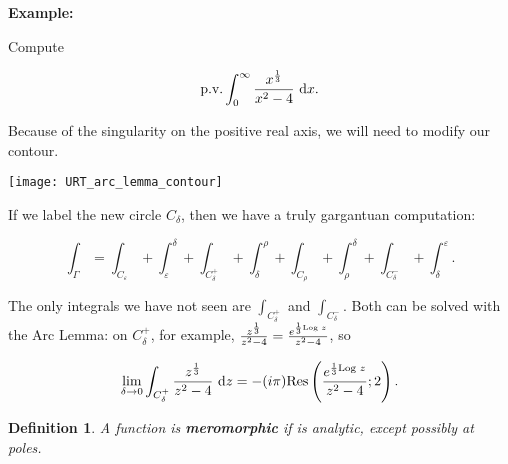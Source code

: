 \documentclass{article}
\theoremstyle{colontheorem}
\newtheorem{definition}[theorem]{Definition}
\newcommand{\Log}{\textnormal{Log }}
\newcommand{\Res}{\textnormal{Res}}
\newcommand{\pv}{\textnormal{p.v.}}
\newenvironment{Def}
{
	\begin{mdframed}[backgroundcolor=DefGreen!10]
	\begin{definition}
}
{
	\end{definition}
	\end{mdframed}
	
	\vspace{.15in}
}
\newenvironment{Example}
{
	\begin{mdframed}
	\textbf{Example:}%
}
{
	\end{mdframed}
	
	\vspace{.15in}
}
\begin{document}
\begin{Example}
	Compute
	
	$$
		\pv \int_0^\infty \frac{x^{\frac{1}{3}}}{x^2 - 4}\ \textnormal{d}x.
	$$
	
	Because of the singularity on the positive real axis, we will need to modify our contour.
	
	\begin{center}
		
		\texttt{[image: URT\_arc\_lemma\_contour]}
		
	\end{center}
	
	If we label the new circle $C_\delta$, then we have a truly gargantuan computation:
	
	$$
		\int_\Gamma = \int_{C_\varepsilon} + \int_\varepsilon^\delta + \int_{C_\delta^+} + \int_\delta^\rho + \int_{C_\rho} + \int_\rho^\delta + \int_{C_\delta^-} + \int_\delta^\varepsilon.
	$$
	
	The only integrals we have not seen are $\int_{C_\delta^+}$ and $\int_{C_\delta^-}$. Both can be solved with the Arc Lemma: on $C_\delta^+$, for example, $\frac{z^{\frac{1}{3}}}{z^2 - 4} = \frac{e^{\frac{1}{3} \Log z}}{z^2 - 4}$, so
	
	$$
		\lim\limits_{\delta \to 0} \int_{C_\delta^+} \frac{z^{\frac{1}{3}}}{z^2 - 4}\ \textnormal{d}z = -(i \pi) \Res \left( \frac{e^{\frac{1}{3} \Log z}}{z^2 - 4}; 2 \right).
	$$
	
\end{Example}



\begin{Def}
	
	A function is \textbf{meromorphic} if is analytic, except possibly at poles.
	
\end{Def}
\end{document}
